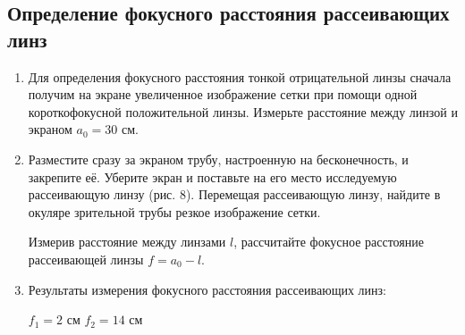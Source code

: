 \subsection*{Определение фокусного расстояния рассеивающих линз}
\begin{enumerate}
    \item Для определения фокусного расстояния тонкой отрицательной линзы сначала получим на экране увеличенное изображение сетки при помощи одной короткофокусной положительной линзы. Измерьте расстояние между линзой и экраном $a_0 = 30$ см.
    \item Разместите сразу за экраном трубу, настроенную на бесконечность, и закрепите её. Уберите экран и поставьте на его место исследуемую рассеивающую линзу (рис. 8). Перемещая рассеивающую линзу, найдите в окуляре зрительной трубы резкое изображение сетки. \par
    Измерив расстояние между линзами $l$, рассчитайте фокусное расстояние рассеивающей линзы $f = a_0 - l$.
    \item Результаты измерения фокусного расстояния рассеивающих линз:
    \begin{center}
        $f_1 = 2$ см \hspace{1cm}  $f_2 = 14$ см
    \end{center}
\end{enumerate}

